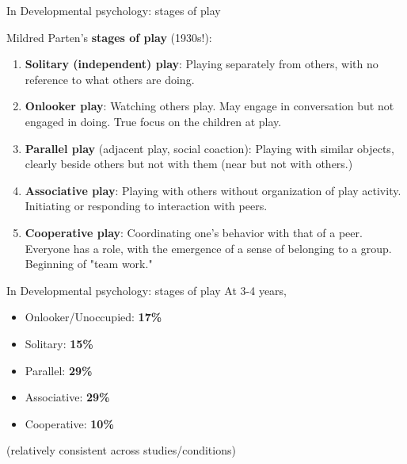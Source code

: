 \documentclass[compress]{beamer}
\begin{document}
{
\begin{frame}{In Developmental psychology: stages of play}

    Mildred Parten's {\bf stages of play} (1930s!):

    \begin{enumerate}
        \item<1-> {\bf Solitary (independent) play}: Playing separately from
            others, with no reference to what others are doing.
        \item<2-> {\bf Onlooker play}: Watching others play. May engage in
            conversation but not engaged in doing. True focus on the children at
            play.
        \item<3-> {\bf Parallel play} (adjacent play, social coaction): Playing
            with similar objects, clearly beside others but not with them (near
            but not with others.)
        \item<4-> {\bf Associative play}:  Playing with others without
            organization of play activity. Initiating or responding to
            interaction with peers. 
        \item<5-> {\bf Cooperative play}: Coordinating one’s behavior with that
            of a peer. Everyone has a role, with the emergence of a sense of
            belonging to a group. Beginning of "team work."
    \end{enumerate}

\end{frame}
}

{
\begin{frame}{In Developmental psychology: stages of play}
    At 3-4 years,

    \begin{itemize}
        \item Onlooker/Unoccupied: {\bf 17\%}
        \item Solitary: {\bf 15\%}
        \item Parallel: {\bf 29\%}
        \item Associative: {\bf 29\%}
        \item Cooperative: {\bf 10\%}
    \end{itemize}

    (relatively consistent across studies/conditions)
\end{frame}
}
\end{document}
